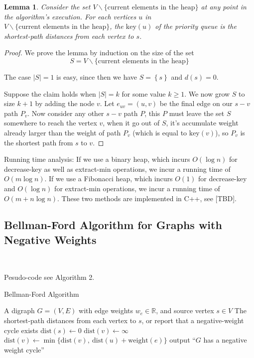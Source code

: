 \documentclass[11pt]{article}
\theoremstyle{plain}
\newtheorem{lemma}{Lemma}[section]
\begin{document}
  \begin{lemma}
    Consider the set $V \backslash \{\text{current elements in the heap}\}$ at any point in the 
    algorithm's execution. For each vertices $u$ in $V \backslash \{\text{current elements in the heap}\}$, 
    the $\text{key}(u)$ of the priority queue is the shortest-path distances from each vertex to $s$.
  \end{lemma}

  \begin{proof}
    We prove the lemma by induction on the size of the set 
    \[
      S = V \backslash \{\text{current elements in the heap}\}
    \]

    The case $|S|=1$ is easy, since then we have $S = \left\{ s \right\} $ and $d(s) = 0$.

    Suppose the claim holds when $|S| = k$ for some value $k \geq 1$. We now grow $S$ to size $k+1$ by adding the node $v$.
    Let $e_{uv}=(u, v)$ be the final edge on our $s-v$ path $P_v$. Now consider any other $s-v$ path $P$, 
    this $P$ must leave the set $S$ somewhere to reach the vertex $v$, when it go out of $S$, it's accumulate 
    weight already larger than the weight of path $P_v$ (which is equal to $\text{key}(v)$), so $P_v$ is the shortest path from $s$ to $v$.
  \end{proof}

  Running time analysis: If we use a binary heap, which incurs $O(\log n)$ for decrease-key as well as extract-min 
  operations, we incur a running time of $O(m \log n)$. If we use a Fibonacci heap, which incurs $O(1)$ for decrease-key
  and $O(\log n)$ for extract-min operations, we incur a running time of $O(m + n \log n)$. These two methods are implemented in C++, see [TBD].

\subsection{Bellman-Ford Algorithm for Graphs with Negative Weights}\

Pesudo-code see Algorithm 2.

\begin{algorithm}
  \caption{Bellman-Ford Algorithm}
  \begin{algorithmic}[1]
  \REQUIRE A digraph $G = (V, E)$ with edge weights $w_e \in \mathbb{R}$, and source vertex $s \in V$
  \ENSURE The shortest-path distances from each vertex to $s$, or report that a negative-weight cycle exists
  \STATE $\text{dist}(s) \leftarrow 0$ 
      \STATE $\text{dist}(v) \leftarrow \infty$
  \ENDFOR
          \STATE $\text{dist}(v) \leftarrow \min\{\text{dist}(v),\ \text{dist}(u) + \text{weight}(e)\}$
      \ENDFOR
  \ENDFOR
      \STATE output ``$G$ has a negative weight cycle''
  \ENDIF
  \end{algorithmic}
\end{algorithm}
\end{document}
